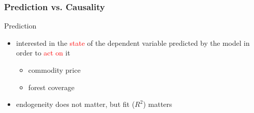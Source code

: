 \documentclass[fleqn]{beamer}\usepackage[]{graphicx}\usepackage[]{color}
\begin{document}
\begin{frame}[c]
  \frametitle{Prediction vs. Causality}
\begin{block}{Prediction}
  \begin{itemize}
    \item interested in the \textcolor{red}{state} of the dependent variable predicted by the model in order to \textcolor{red}{act on} it
    \begin{itemize}
      \item commodity price
      \item forest coverage
    \end{itemize}
    \item endogeneity does not matter, but fit ($R^2$) matters
  \end{itemize}
\end{block}
\end{frame}
\end{document}
